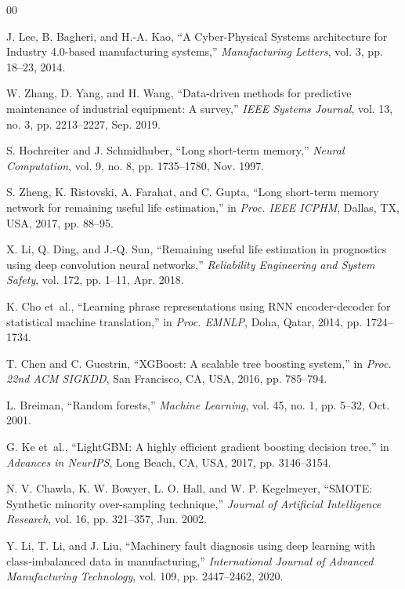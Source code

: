 \documentclass[conference]{IEEEtran}
\begin{document}
\begin{thebibliography}{00}

J. Lee, B. Bagheri, and H.-A. Kao, ``A Cyber-Physical Systems architecture
for Industry 4.0-based manufacturing systems,'' \textit{Manufacturing
Letters}, vol. 3, pp. 18--23, 2014.

W. Zhang, D. Yang, and H. Wang, ``Data-driven methods for predictive
maintenance of industrial equipment: A survey,'' \textit{IEEE Systems
Journal}, vol. 13, no. 3, pp. 2213--2227, Sep. 2019.

S. Hochreiter and J. Schmidhuber, ``Long short-term memory,''
\textit{Neural Computation}, vol. 9, no. 8, pp. 1735--1780, Nov. 1997.

S. Zheng, K. Ristovski, A. Farahat, and C. Gupta, ``Long short-term memory
network for remaining useful life estimation,'' in \textit{Proc. IEEE ICPHM},
Dallas, TX, USA, 2017, pp. 88--95.

X. Li, Q. Ding, and J.-Q. Sun, ``Remaining useful life estimation in
prognostics using deep convolution neural networks,'' \textit{Reliability
Engineering and System Safety}, vol. 172, pp. 1--11, Apr. 2018.

K. Cho et~al., ``Learning phrase representations using RNN encoder-decoder
for statistical machine translation,'' in \textit{Proc. EMNLP}, Doha, Qatar,
2014, pp. 1724--1734.

T. Chen and C. Guestrin, ``XGBoost: A scalable tree boosting system,'' in
\textit{Proc. 22nd ACM SIGKDD}, San Francisco, CA, USA, 2016, pp. 785--794.

L. Breiman, ``Random forests,'' \textit{Machine Learning}, vol. 45, no. 1,
pp. 5--32, Oct. 2001.

G. Ke et~al., ``LightGBM: A highly efficient gradient boosting decision
tree,'' in \textit{Advances in NeurIPS}, Long Beach, CA, USA, 2017,
pp. 3146--3154.

N. V. Chawla, K. W. Bowyer, L. O. Hall, and W. P. Kegelmeyer, ``SMOTE:
Synthetic minority over-sampling technique,'' \textit{Journal of Artificial
Intelligence Research}, vol. 16, pp. 321--357, Jun. 2002.

Y. Li, T. Li, and J. Liu, ``Machinery fault diagnosis using deep learning
with class-imbalanced data in manufacturing,'' \textit{International Journal
of Advanced Manufacturing Technology}, vol. 109, pp. 2447--2462, 2020.


\end{thebibliography}
\end{document}
